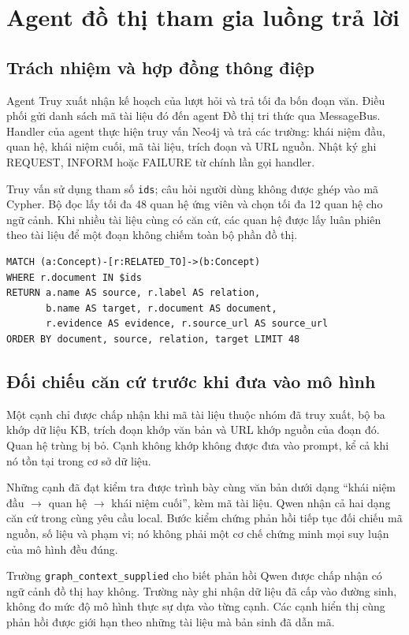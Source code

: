 \section{Agent đồ thị tham gia luồng trả lời}
\subsection{Trách nhiệm và hợp đồng thông điệp}
Agent Truy xuất nhận kế hoạch của lượt hỏi và trả tối đa bốn đoạn văn. Điều phối gửi danh sách mã tài liệu đó đến agent Đồ thị tri thức qua MessageBus. Handler của agent thực hiện truy vấn Neo4j và trả các trường: khái niệm đầu, quan hệ, khái niệm cuối, mã tài liệu, trích đoạn và URL nguồn. Nhật ký ghi REQUEST, INFORM hoặc FAILURE từ chính lần gọi handler.

Truy vấn sử dụng tham số \texttt{ids}; câu hỏi người dùng không được ghép vào mã Cypher. Bộ đọc lấy tối đa 48 quan hệ ứng viên và chọn tối đa 12 quan hệ cho ngữ cảnh. Khi nhiều tài liệu cùng có căn cứ, các quan hệ được lấy luân phiên theo tài liệu để một đoạn không chiếm toàn bộ phần đồ thị.

\begin{Verbatim}[fontsize=\small,breaklines=true]
MATCH (a:Concept)-[r:RELATED_TO]->(b:Concept)
WHERE r.document IN $ids
RETURN a.name AS source, r.label AS relation,
       b.name AS target, r.document AS document,
       r.evidence AS evidence, r.source_url AS source_url
ORDER BY document, source, relation, target LIMIT 48
\end{Verbatim}

\subsection{Đối chiếu căn cứ trước khi đưa vào mô hình}
Một cạnh chỉ được chấp nhận khi mã tài liệu thuộc nhóm đã truy xuất, bộ ba khớp dữ liệu KB, trích đoạn khớp văn bản và URL khớp nguồn của đoạn đó. Quan hệ trùng bị bỏ. Cạnh không khớp không được đưa vào prompt, kể cả khi nó tồn tại trong cơ sở dữ liệu.

Những cạnh đã đạt kiểm tra được trình bày cùng văn bản dưới dạng ``khái niệm đầu $\rightarrow$ quan hệ $\rightarrow$ khái niệm cuối'', kèm mã tài liệu. Qwen nhận cả hai dạng căn cứ trong cùng yêu cầu local. Bước kiểm chứng phản hồi tiếp tục đối chiếu mã nguồn, số liệu và phạm vi; nó không phải một cơ chế chứng minh mọi suy luận của mô hình đều đúng.

Trường \texttt{graph\_context\_supplied} cho biết phản hồi Qwen được chấp nhận có ngữ cảnh đồ thị hay không. Trường này ghi nhận dữ liệu đã cấp vào đường sinh, không đo mức độ mô hình thực sự dựa vào từng cạnh. Các cạnh hiển thị cùng phản hồi được giới hạn theo những tài liệu mà bản sinh đã dẫn mã.

